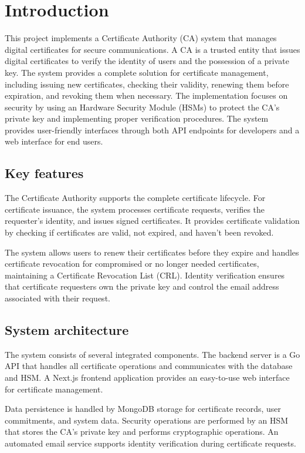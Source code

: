 \chapter{Introduction}
\label{ch:introduction}
This project implements a Certificate Authority (CA) system that manages digital certificates for 
secure communications. A CA is a trusted entity that issues digital certificates to verify the identity 
of users and the possession of a private key.
The system provides a complete solution for certificate management, including issuing new certificates, 
checking their validity, renewing them before expiration, and revoking them when necessary. 
The implementation focuses on security by using an Hardware Security Module (HSMs) to protect
the CA's private key and implementing proper verification procedures.
The system provides user-friendly interfaces through both API endpoints for developers and a web 
interface for end users. 

\section{Key features}

The Certificate Authority supports the complete certificate lifecycle. 
For certificate issuance, the system processes certificate requests, verifies the requester's identity, 
and issues signed certificates. 
It provides certificate validation by checking if certificates are valid, not expired, and haven't been revoked.

The system allows users to renew their certificates before they expire and handles certificate revocation 
for compromised or no longer needed certificates, maintaining a Certificate Revocation List (CRL). 
Identity verification ensures that certificate requesters own the private key and control the email 
address associated with their request.

\section{System architecture}

The system consists of several integrated components. The backend server is a Go API that handles 
all certificate operations and communicates with the database and HSM. 
A Next.js frontend application provides an easy-to-use web interface for certificate management.

Data persistence is handled by MongoDB storage for certificate records, user commitments, and system data. 
Security operations are performed by an HSM that stores the CA's private key 
and performs cryptographic operations. 
An automated email service supports identity verification during certificate requests.


